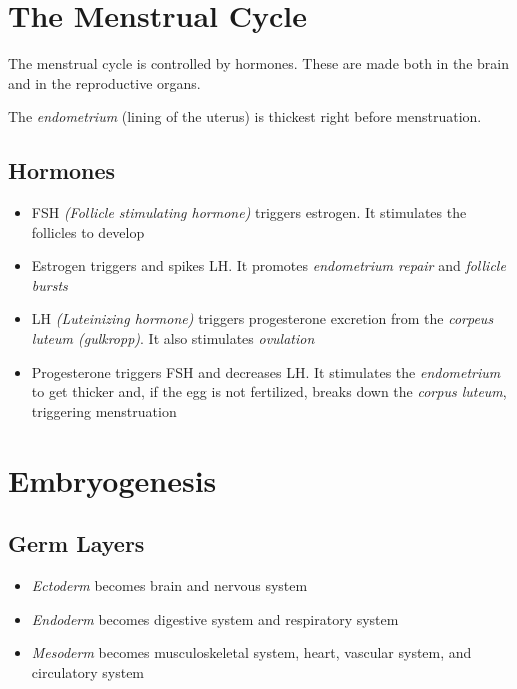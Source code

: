 \documentclass[11pt,twoside]{article}
\begin{document}
	\tableofcontents
	\section{The Menstrual Cycle}
		The menstrual cycle is controlled by hormones. These are made both in the brain and in the reproductive organs.
		
		The \emph{endometrium} (lining of the uterus) is thickest right before menstruation.
		\subsection{Hormones}
			\begin{itemize}
				\item{FSH \emph{(Follicle stimulating hormone)} triggers estrogen. It stimulates the follicles to develop}
				\item{Estrogen triggers and spikes LH. It promotes \emph{endometrium repair} and \emph{follicle bursts}}
				\item{LH \emph{(Luteinizing hormone)} triggers progesterone excretion from the \emph{corpeus luteum (gulkropp)}. It also stimulates \emph{ovulation}}
				\item{Progesterone triggers FSH and decreases LH. It stimulates the \emph{endometrium} to get thicker and, if the egg is not fertilized, breaks down the \emph{corpus luteum}, triggering menstruation}
			\end{itemize}
		\section{Embryogenesis}
			\subsection{Germ Layers}
				\begin{itemize}
					\item{\emph{Ectoderm} becomes brain and nervous system}
					\item{\emph{Endoderm} becomes digestive system and respiratory system}
					\item{\emph{Mesoderm} becomes musculoskeletal system, heart, vascular system, and circulatory system}
				\end{itemize}
\end{document}
